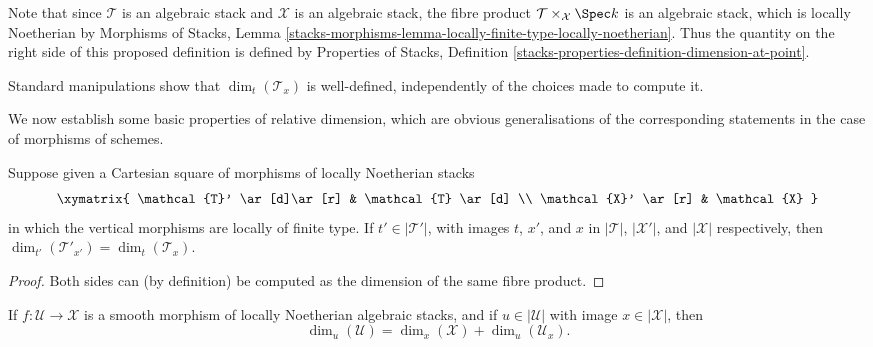 \noindent
Note that since $\mathcal{T}$ is an algebraic stack and $\mathcal{X}$ is an
algebraic stack, the fibre product $\mathcal{T}\times_{\mathcal{X}} \Spec k$
is an algebraic stack, which is locally Noetherian by
Morphisms of Stacks, Lemma
\ref{stacks-morphisms-lemma-locally-finite-type-locally-noetherian}.
Thus the quantity on the right side of this proposed definition
is defined by Properties of Stacks,
Definition \ref{stacks-properties-definition-dimension-at-point}.

\begin{remark}
\label{remark-dimension-tangent-space-well-defined}
Standard manipulations show that $\dim_t(\mathcal{T}_x)$ is well-defined,
independently of the choices made to compute it.
\end{remark}

\noindent
We now establish some basic properties of relative dimension, which
are obvious generalisations of the corresponding statements in the
case of morphisms of schemes.

\begin{lemma}
\label{lemma-base-change-invariance-of-relative-dimension}
Suppose given
a Cartesian square of morphisms of locally Noetherian stacks
$$
\xymatrix{
\mathcal{T}' \ar[d]\ar[r] & \mathcal{T} \ar[d] \\
\mathcal{X}' \ar[r] & \mathcal{X}
}
$$
in which the vertical morphisms are locally of finite type.
If $t' \in |\mathcal{T}'|$,
with images $t$, $x'$, and $x$ in $|\mathcal{T}|$, $|\mathcal{X}'|$, and
$|\mathcal{X}|$
respectively, then $\dim_{t'}(\mathcal{T}'_{x'}) = \dim_{t}(\mathcal{T}_x).$
\end{lemma}

\begin{proof}
Both sides can (by definition) be computed as the
dimension of the same fibre product.
\end{proof}

\begin{lemma}
\label{lemma-behaviour-of-dimensions-wrt-smooth-morphisms-stacky}
If $f: \mathcal{U} \to \mathcal{X}$ is a smooth morphism of locally Noetherian
algebraic stacks, and
if $u \in |\mathcal{U}|$ with image $x \in |\mathcal{X}|$,
then
$$
\dim_u (\mathcal{U}) = \dim_x(\mathcal{X}) + \dim_{u} (\mathcal{U}_x).
$$
\end{lemma}


